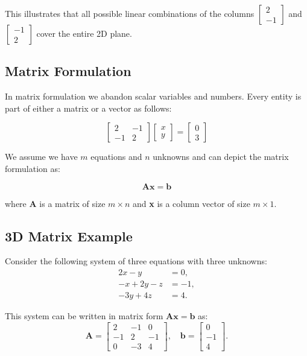 This illustrates that all possible linear combinations of the columns \( \begin{bmatrix} 2 \\ -1 \end{bmatrix} \) and \( \begin{bmatrix} -1 \\ 2 \end{bmatrix} \) cover the entire 2D plane.


\subsection*{Matrix Formulation}
In matrix formulation we abandon scalar variables and numbers. Every entity is part of either a matrix or a vector as follows:

\begin{equation*}
    \begin{bmatrix}
        2 & -1 \\
        -1 & 2
    \end{bmatrix}
    \begin{bmatrix}
        x \\
        y
    \end{bmatrix}
    =
    \begin{bmatrix}
        0 \\
        3
    \end{bmatrix}
\end{equation*}


We assume we have $m$ equations and $n$ unknowns and can depict the matrix formulation as:

\[\mathbf{Ax} = \mathbf{b}\]

where \textbf{A} is a matrix of size $m\times n$ and \textbf{x} is a column vector of size $m\times 1$.


\subsection*{3D Matrix Example}

Consider the following system of three equations with three unknowns:
\begin{align}
    2x - y &= 0, \\
    -x + 2y - z &= -1, \\
    -3y + 4z &= 4.
\end{align}

This system can be written in matrix form \( \mathbf{A}\mathbf{x} = \mathbf{b} \) as:
\[
\mathbf{A} =
\begin{bmatrix}
    2 & -1 & 0 \\
    -1 & 2 & -1 \\
    0 & -3 & 4
\end{bmatrix},
\quad
\mathbf{b} =
\begin{bmatrix}
    0 \\
    -1 \\
    4
\end{bmatrix}.
\]

